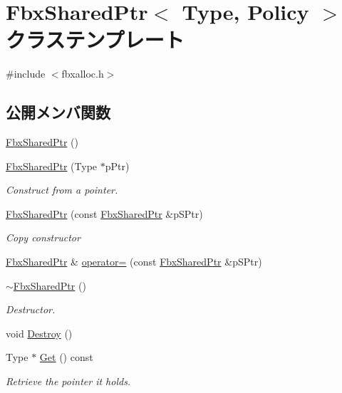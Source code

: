 \hypertarget{class_fbx_shared_ptr}{}\section{Fbx\+Shared\+Ptr$<$ Type, Policy $>$ クラステンプレート}
\label{class_fbx_shared_ptr}


{\ttfamily \#include $<$fbxalloc.\+h$>$}

\subsection*{公開メンバ関数}
\begin{DoxyCompactItemize}
\item 
\hyperlink{class_fbx_shared_ptr_a660b09efbcf67f747cb72163dccf1e11}{Fbx\+Shared\+Ptr} ()
\item 
\hyperlink{class_fbx_shared_ptr_a694b2cfd410b1e18b87d697f30518af8}{Fbx\+Shared\+Ptr} (Type $\ast$p\+Ptr)
\begin{DoxyCompactList}\small\item\em Construct from a pointer. \end{DoxyCompactList}\item 
\hyperlink{class_fbx_shared_ptr_a7e6b1c33f8f837c6389ba99f88faafff}{Fbx\+Shared\+Ptr} (const \hyperlink{class_fbx_shared_ptr}{Fbx\+Shared\+Ptr} \&p\+S\+Ptr)
\begin{DoxyCompactList}\small\item\em Copy constructor \end{DoxyCompactList}\item 
\hyperlink{class_fbx_shared_ptr}{Fbx\+Shared\+Ptr} \& \hyperlink{class_fbx_shared_ptr_aab1f664cd0b649231f359554129a1dc5}{operator=} (const \hyperlink{class_fbx_shared_ptr}{Fbx\+Shared\+Ptr} \&p\+S\+Ptr)
\item 
\hyperlink{class_fbx_shared_ptr_a15061ed1e4085e6a053c66b88c509ae6}{$\sim$\+Fbx\+Shared\+Ptr} ()
\begin{DoxyCompactList}\small\item\em Destructor. \end{DoxyCompactList}\item 
void \hyperlink{class_fbx_shared_ptr_a706fe3ede6f8a43589348169f4803c75}{Destroy} ()
\item 
Type $\ast$ \hyperlink{class_fbx_shared_ptr_a3bc4c8f7e69da6a3f53157a895ee345e}{Get} () const
\begin{DoxyCompactList}\small\item\em Retrieve the pointer it holds. \end{DoxyCompactList}\item 

\end{DoxyCompactItemize}
